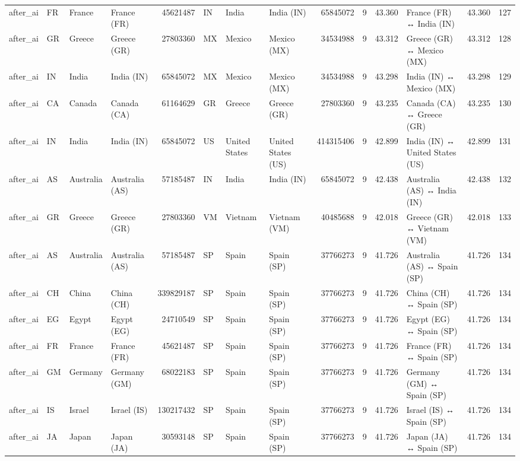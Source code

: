 \begin{tabular}{llllrlllrrrlrr}
after\_ai & FR & France & France (FR) & 45621487 & IN & India & India (IN) & 65845072 & 9 & 43.360 & France (FR) ↔ India (IN) & 43.360 & 127 \\
after\_ai & GR & Greece & Greece (GR) & 27803360 & MX & Mexico & Mexico (MX) & 34534988 & 9 & 43.312 & Greece (GR) ↔ Mexico (MX) & 43.312 & 128 \\
after\_ai & IN & India & India (IN) & 65845072 & MX & Mexico & Mexico (MX) & 34534988 & 9 & 43.298 & India (IN) ↔ Mexico (MX) & 43.298 & 129 \\
after\_ai & CA & Canada & Canada (CA) & 61164629 & GR & Greece & Greece (GR) & 27803360 & 9 & 43.235 & Canada (CA) ↔ Greece (GR) & 43.235 & 130 \\
after\_ai & IN & India & India (IN) & 65845072 & US & United States & United States (US) & 414315406 & 9 & 42.899 & India (IN) ↔ United States (US) & 42.899 & 131 \\
after\_ai & AS & Australia & Australia (AS) & 57185487 & IN & India & India (IN) & 65845072 & 9 & 42.438 & Australia (AS) ↔ India (IN) & 42.438 & 132 \\
after\_ai & GR & Greece & Greece (GR) & 27803360 & VM & Vietnam & Vietnam (VM) & 40485688 & 9 & 42.018 & Greece (GR) ↔ Vietnam (VM) & 42.018 & 133 \\
after\_ai & AS & Australia & Australia (AS) & 57185487 & SP & Spain & Spain (SP) & 37766273 & 9 & 41.726 & Australia (AS) ↔ Spain (SP) & 41.726 & 134 \\
after\_ai & CH & China & China (CH) & 339829187 & SP & Spain & Spain (SP) & 37766273 & 9 & 41.726 & China (CH) ↔ Spain (SP) & 41.726 & 134 \\
after\_ai & EG & Egypt & Egypt (EG) & 24710549 & SP & Spain & Spain (SP) & 37766273 & 9 & 41.726 & Egypt (EG) ↔ Spain (SP) & 41.726 & 134 \\
after\_ai & FR & France & France (FR) & 45621487 & SP & Spain & Spain (SP) & 37766273 & 9 & 41.726 & France (FR) ↔ Spain (SP) & 41.726 & 134 \\
after\_ai & GM & Germany & Germany (GM) & 68022183 & SP & Spain & Spain (SP) & 37766273 & 9 & 41.726 & Germany (GM) ↔ Spain (SP) & 41.726 & 134 \\
after\_ai & IS & Israel & Israel (IS) & 130217432 & SP & Spain & Spain (SP) & 37766273 & 9 & 41.726 & Israel (IS) ↔ Spain (SP) & 41.726 & 134 \\
after\_ai & JA & Japan & Japan (JA) & 30593148 & SP & Spain & Spain (SP) & 37766273 & 9 & 41.726 & Japan (JA) ↔ Spain (SP) & 41.726 & 134 \\

\end{tabular}
